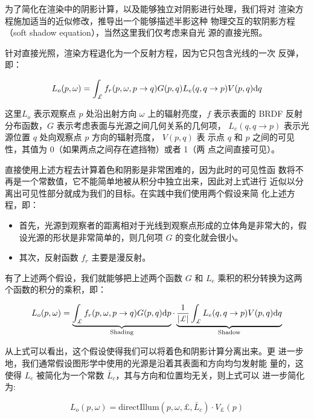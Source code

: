 为了简化在渲染中的阴影计算，以及能够独立对阴影进行处理，我们将对 渲染方程\cite{a:TheRenderingEquation}施加适当的近似修改，推导出一个能够描述半影这种 物理交互的软阴影方程（soft shadow equation），当然这里我们仅考虑来自光 源的直接光照。

针对直接光照，渲染方程退化为一个反射方程，因为它只包含光线的一次 反弹，即：

\begin{equation}
	L_{o}({p},\omega)=\int_{\pounds}f_{r}({p},\omega,{p}\rightarrow{q})G({p},{q})L_{e}({q},{q}\rightarrow{p})V({p},{q}){\rm d}{q}
\end{equation}

\noindent 这里$L_o$ 表示观察点 ${p}$ 处沿出射方向 $\omega$ 上的辐射亮度，$f$ 表示表面的 BRDF 反射分布函数，$G$ 表示考虑表面与光源之间几何关系的几何项， $L_e({q}, {q} \to {p})$ 表示光源位置 ${q}$ 处向观察点 ${p}$ 方向的辐射亮度， $V ({p}, {q})$ 表 示点 ${q}$ 和 ${p}$ 之间的可见性，其值为 0（如果两点之间存在遮挡物）或者 1（两 点之间直接可见）。

直接使用上述方程去计算着色和阴影是非常困难的，因为此时的可见性函 数将不再是一个常数值，它不能简单地被从积分中独立出来，因此对上式进行 近似以分离出可见性部分就成为我们的目标。在实践中我们使用两个假设来简 化上述方程，即：

\begin{itemize}
	\item  首先，光源到观察者的距离相对于光线到观察点形成的立体角是非常大的，假设光源的形状是非常简单的，则几何项 $G$ 的变化就会很小。
	\item 其次，反射函数 $f_r$ 主要是漫反射。
\end{itemize}

有了上述两个假设，我们就能够把上述两个函数 $G$ 和 $L_e$ 乘积的积分转换为这两个函数的积分的乘积，即：

\begin{equation}
	L_{o}({p},\omega)=\underbrace{\int_{\pounds}f_{r}({p},\omega,{p}\rightarrow{q})G({p},{q}){\rm d}{p}}_{\rm Shading}\cdot\underbrace{\frac{1}{|\pounds|} \int_{\pounds} L_{e}({q},{q}\rightarrow{p})V({p},{q}){\rm d}{q}}_{\rm Shadow}
\end{equation} 

从上式可以看出，这个假设使得我们可以将着色和阴影计算分离出来。更 进一步地，我们通常假设图形学中使用的光源是沿着其表面和方向均匀发射能 量的，这使得 $L_e$ 被简化为一个常数 $\bar{L}_c$，其与方向和位置均无关，则上式可以 进一步简化为:


\begin{equation}
	L_{o}({p},\omega)=\text{directIllum}({p},\omega,\pounds,\bar{L}_{c})\cdot V_{\pounds}({p})
\end{equation}

